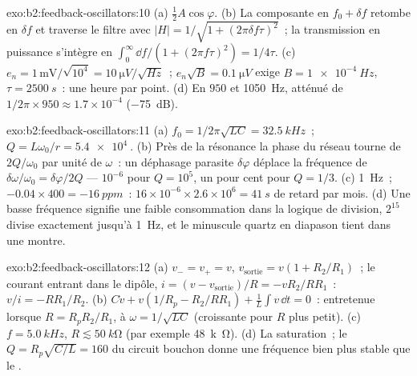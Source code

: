 \begin{solution}{exo:b2:feedback-oscillators:10}
(a) $\tfrac12A\cos\varphi$. (b) La composante en $f_0 + \delta f$ retombe en $\delta f$
et traverse le filtre avec $|H| = 1/\sqrt{1 + (2\pi\delta f\tau)^2}$~; la transmission
en puissance s'intègre en $\int_0^\infty\dd f/(1 + (2\pi f\tau)^2) = 1/4\tau$.
(c) $e_n = 1\,\text{mV}/\sqrt{10^4} = \qty{10}{\micro V/\sqrt{Hz}}$~; $e_n\sqrt B = \qty{0.1}{\micro V}$
exige $B = \qty{1e-4}{Hz}$, $\tau = \qty{2500}{s}$~: une heure par point. (d) En $950$
et \qty{1050}{Hz}, atténué de $1/2\pi \times 950 \approx 1.7 \times 10^{-4}$ (\qty{-75}{dB}).
\end{solution}

\begin{solution}{exo:b2:feedback-oscillators:11}
(a) $f_0 = 1/2\pi\sqrt{LC} = \qty{32.5}{kHz}$~; $Q = L\omega_0/r = \qty{5.4e4}{}$. (b) Près de la
résonance la phase du réseau tourne de $2Q/\omega_0$ par unité de $\omega$~: un
déphasage parasite $\delta\varphi$ déplace la fréquence de $\delta\omega/\omega_0 =
\delta\varphi/2Q$ --- $10^{-6}$ pour $Q = 10^5$, un pour cent pour $Q = 1/3$. (c) \qty{1}{Hz}~;
$-0.04 \times 400 = \qty{-16}{ppm}$~: $16 \times 10^{-6} \times 2.6 \times 10^6 = \qty{41}{s}$ de retard par
mois. (d) Une basse fréquence signifie une faible consommation dans la logique de division, $2^{15}$
divise exactement jusqu'à \qty{1}{Hz}, et le minuscule quartz en diapason tient dans une
montre.
\end{solution}

\begin{solution}{exo:b2:feedback-oscillators:12}
(a) $v_- = v_+ = v$, $v_{\text{sortie}} = v(1 + R_2/R_1)$~; le courant entrant dans le
dipôle, $i = (v - v_{\text{sortie}})/R = -vR_2/RR_1$~: $v/i = -RR_1/R_2$. (b) $C\dot v +
v(1/R_p - R_2/RR_1) + \frac1L\int v\,\dd t = 0$~: entretenue lorsque $R = R_pR_2/R_1$,
à $\omega = 1/\sqrt{LC}$ (croissante pour $R$ plus petit). (c) $f = \qty{5.0}{kHz}$, $R \lesssim
\qty{50}{k\ohm}$ (par exemple \qty{48}{k\ohm}). (d) La saturation~; le $Q = R_p
\sqrt{C/L} = 160$ du circuit bouchon donne une fréquence bien plus stable que le .
\end{solution}

